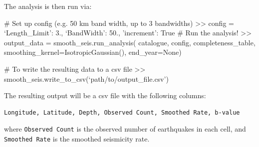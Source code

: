 The analysis is then run via:

\begin{python}[frame=single]
# Set up config (e.g. 50 km band width, up to 3 bandwidths)
>> config = {`Length_Limit': 3.,
             `BandWidth': 50.,
             'increment': True}
# Run the analysis!
>> output_data = smooth_seis.run_analysis(
    catalogue,
    config,
    completeness_table, 
    smoothing_kernel=IsotropicGaussian(), 
    end_year=None)

# To write the resulting data to a csv file
>> smooth_seis.write_to_csv(`path/to/output_file.csv')
\end{python}

The resulting output will be a csv file with the following columns:
\begin{Verbatim}[frame=single, commandchars=\\\{\}, fontsize=\scriptsize]
Longitude, Latitude, Depth, Observed Count, Smoothed Rate, b-value
\end{Verbatim}

\noindent where \verb=Observed Count= is the observed number of earthquakes in each cell, and \\ 
\verb=Smoothed Rate= is the smoothed seismicity rate.
